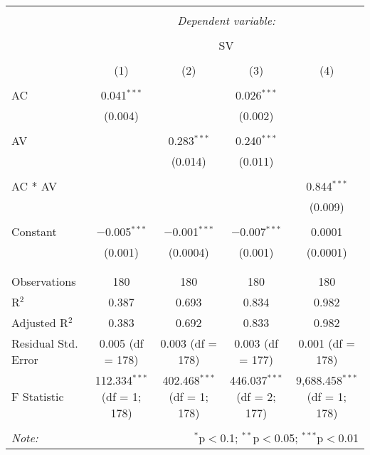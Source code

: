 
\begin{table}[!htbp] \centering 
  \caption{} 
  \label{} 
\begin{tabular}{@{\extracolsep{5pt}}lcccc} 
\\[-1.8ex]\hline 
\hline \\[-1.8ex] 
 & \multicolumn{4}{c}{\textit{Dependent variable:}} \\ 
\cline{2-5} 
\\[-1.8ex] & \multicolumn{4}{c}{SV} \\ 
\\[-1.8ex] & (1) & (2) & (3) & (4)\\ 
\hline \\[-1.8ex] 
 AC & 0.041$^{***}$ &  & 0.026$^{***}$ &  \\ 
  & (0.004) &  & (0.002) &  \\ 
  & & & & \\ 
 AV &  & 0.283$^{***}$ & 0.240$^{***}$ &  \\ 
  &  & (0.014) & (0.011) &  \\ 
  & & & & \\ 
 AC * AV &  &  &  & 0.844$^{***}$ \\ 
  &  &  &  & (0.009) \\ 
  & & & & \\ 
 Constant & $-$0.005$^{***}$ & $-$0.001$^{***}$ & $-$0.007$^{***}$ & 0.0001 \\ 
  & (0.001) & (0.0004) & (0.001) & (0.0001) \\ 
  & & & & \\ 
\hline \\[-1.8ex] 
Observations & 180 & 180 & 180 & 180 \\ 
R$^{2}$ & 0.387 & 0.693 & 0.834 & 0.982 \\ 
Adjusted R$^{2}$ & 0.383 & 0.692 & 0.833 & 0.982 \\ 
Residual Std. Error & 0.005 (df = 178) & 0.003 (df = 178) & 0.003 (df = 177) & 0.001 (df = 178) \\ 
F Statistic & 112.334$^{***}$ (df = 1; 178) & 402.468$^{***}$ (df = 1; 178) & 446.037$^{***}$ (df = 2; 177) & 9,688.458$^{***}$ (df = 1; 178) \\ 
\hline 
\hline \\[-1.8ex] 
\textit{Note:}  & \multicolumn{4}{r}{$^{*}$p$<$0.1; $^{**}$p$<$0.05; $^{***}$p$<$0.01} \\ 
\end{tabular} 
\end{table} 
